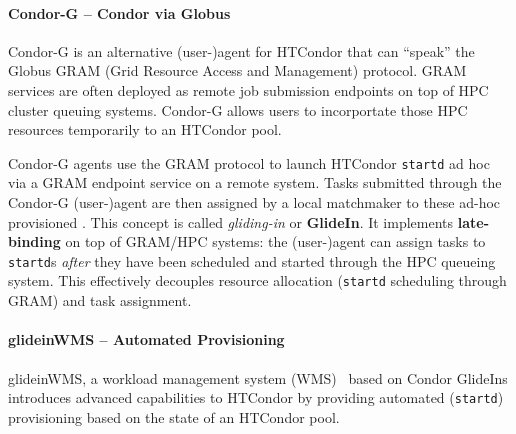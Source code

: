 \documentclass{sig-alternate}
\begin{document}

%
\paragraph{Condor-G -- Condor via Globus}

Condor-G is an alternative (user-)agent for HTCondor that can ``speak'' the
Globus GRAM (Grid Resource Access and Management) protocol. GRAM services are
often deployed as remote job submission endpoints on top of HPC cluster
queuing systems. Condor-G allows users to incorportate those HPC resources
temporarily to an HTCondor pool.

Condor-G agents use the GRAM protocol to launch HTCondor \texttt{startd}
\pilots ad hoc via a GRAM endpoint service on a remote system. Tasks submitted
through the Condor-G (user-)agent are then assigned by a local matchmaker to
these ad-hoc provisioned \pilots. This concept is called \textit {gliding-in}
or \textbf{GlideIn}. It implements \textbf{late-binding} on top of GRAM/HPC
systems: the (user-)agent can assign tasks to \texttt{startd}s \textit{after}
they have been scheduled and started through the HPC queueing system. This
effectively decouples resource allocation (\texttt{startd} scheduling through
GRAM) and task assignment.

%
\paragraph{glideinWMS -- Automated \pilot Provisioning}

glideinWMS, a workload management system (WMS)~\cite{1742-6596-119-6-062044}
based on Condor GlideIns introduces advanced \pilotjob capabilities to HTCondor
by providing automated \pilot (\texttt{startd}) provisioning based on the state
of an HTCondor pool.


%
\end{document}
